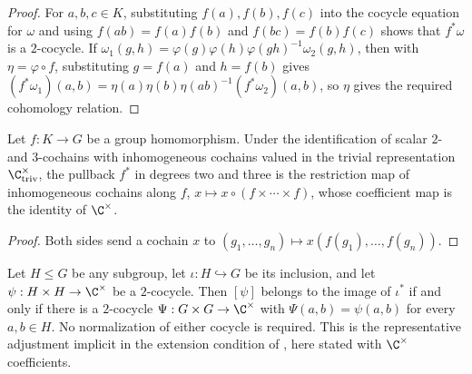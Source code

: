 \begin{proof}\leanok
    For $a,b,c\in K$, substituting $f(a),f(b),f(c)$ into the cocycle equation
    for $\omega$ and using $f(ab)=f(a)f(b)$ and $f(bc)=f(b)f(c)$ shows that
    $f^*\omega$ is a $2$-cocycle.
    If $\omega_1(g,h)=\varphi(g)\varphi(h)\varphi(gh)^{-1}\omega_2(g,h)$,
    then with $\eta=\varphi\circ f$, substituting $g=f(a)$ and $h=f(b)$ gives
    $(f^*\omega_1)(a,b)=\eta(a)\eta(b)\eta(ab)^{-1}(f^*\omega_2)(a,b)$,
    so $\eta$ gives the required cohomology relation.
\end{proof}

\begin{lemma}
    \label{lem:mpug_restriction_inhomogeneous}
    \leanok
    Let $f:K\to G$ be a group homomorphism. Under the identification of scalar
    $2$- and $3$-cochains with inhomogeneous cochains valued in the trivial
    representation $\C^\times_{\mathrm{triv}}$, the pullback $f^*$ in degrees
    two and three is the restriction map of inhomogeneous cochains along $f$,
    $x\mapsto x\circ(f\times\cdots\times f)$, whose coefficient map is the
    identity of $\C^\times$.
\end{lemma}

\begin{proof}\leanok
    Both sides send a cochain $x$ to $(g_1,\dots,g_n)\mapsto x(f(g_1),\dots,f(g_n))$.
\end{proof}

\begin{lemma}
    \label{thm:mpug_h2_exact_extension}
    \leanok
    Let $H\le G$ be any subgroup, let $\iota:H\hookrightarrow G$ be its
    inclusion, and let $\psi:H\times H\to\C^\times$ be a $2$-cocycle.
    Then $[\psi]$ belongs to the image of $\iota^*$ if and only if there is
    a $2$-cocycle $\Psi:G\times G\to\C^\times$ with
    $\Psi(a,b)=\psi(a,b)$ for every $a,b\in H$.
    No normalization of either cocycle is required.
    This is the representative adjustment implicit in the extension
    condition of \cite[lines~7042--7064]{FrancoRubio2025MPUGauging},
    here stated with $\C^\times$ coefficients.
\end{lemma}

